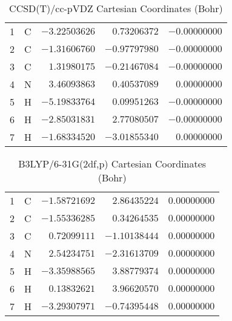 \documentclass[10pt,oneside]{article}
\begin{document}
\begin{table}[h!]
\centering
\caption{CCSD(T)/cc-pVDZ Cartesian Coordinates (Bohr)}
\begin{tabular}{llrrr}
1  & C  & $-3.22503626$ & $ 0.73206372$ & $-0.00000000$ \\
2  & C  & $-1.31606760$ & $-0.97797980$ & $-0.00000000$ \\
3  & C  & $ 1.31980175$ & $-0.21467084$ & $-0.00000000$ \\
4  & N  & $ 3.46093863$ & $ 0.40537089$ & $ 0.00000000$ \\
5  & H  & $-5.19833764$ & $ 0.09951263$ & $-0.00000000$ \\
6  & H  & $-2.85031831$ & $ 2.77080507$ & $-0.00000000$ \\
7  & H  & $-1.68334520$ & $-3.01855340$ & $ 0.00000000$ \\
\end{tabular}
\end{table}

\begin{table}[h!]
\centering
\caption{B3LYP/6-31G(2df,p) Cartesian Coordinates (Bohr)}
\begin{tabular}{llrrr}
1  & C  & $-1.58721692$ & $ 2.86435224$ & $ 0.00000000$ \\
2  & C  & $-1.55336285$ & $ 0.34264535$ & $ 0.00000000$ \\
3  & C  & $ 0.72099111$ & $-1.10138444$ & $ 0.00000000$ \\
4  & N  & $ 2.54234751$ & $-2.31613709$ & $ 0.00000000$ \\
5  & H  & $-3.35988565$ & $ 3.88779374$ & $ 0.00000000$ \\
6  & H  & $ 0.13832621$ & $ 3.96620570$ & $ 0.00000000$ \\
7  & H  & $-3.29307971$ & $-0.74395448$ & $ 0.00000000$ \\
\end{tabular}
\end{table}

\clearpage
\end{document}
